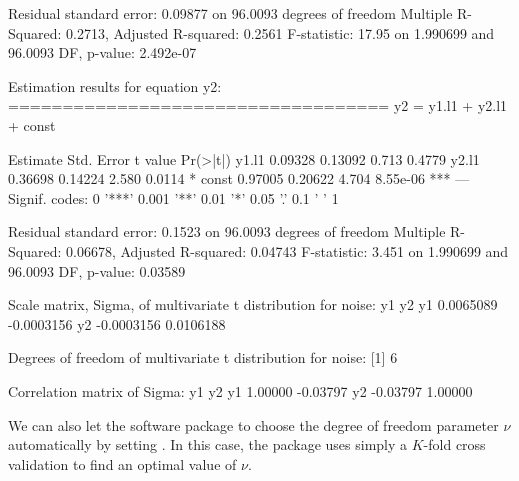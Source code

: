 \documentclass[
]{jss}
\begin{document}
\begin{CodeChunk}
\begin{CodeOutput}
Residual standard error: 0.09877 on 96.0093 degrees of freedom
Multiple R-Squared: 0.2713, Adjusted R-squared: 0.2561 
F-statistic: 17.95 on 1.990699 and 96.0093 DF,  p-value: 2.492e-07 


Estimation results for equation y2: 
=================================== 
y2 = y1.l1 + y2.l1 + const 

      Estimate Std. Error t value Pr(>|t|)    
y1.l1  0.09328    0.13092   0.713   0.4779    
y2.l1  0.36698    0.14224   2.580   0.0114 *  
const  0.97005    0.20622   4.704 8.55e-06 ***
---
Signif. codes:  0 '***' 0.001 '**' 0.01 '*' 0.05 '.' 0.1 ' ' 1


Residual standard error: 0.1523 on 96.0093 degrees of freedom
Multiple R-Squared: 0.06678,    Adjusted R-squared: 0.04743 
F-statistic: 3.451 on 1.990699 and 96.0093 DF,  p-value: 0.03589 



Scale matrix, Sigma, of multivariate t distribution for noise:
           y1         y2
y1  0.0065089 -0.0003156
y2 -0.0003156  0.0106188

Degrees of freedom of multivariate t distribution for noise:
[1] 6

Correlation matrix of Sigma:
         y1       y2
y1  1.00000 -0.03797
y2 -0.03797  1.00000
\end{CodeOutput}
\end{CodeChunk}

We can also let the software package to choose the degree of freedom
parameter \(\nu\) automatically by setting . In this
case, the package uses simply a \(K\)-fold cross validation to find an
optimal value of \(\nu\).
\end{document}
